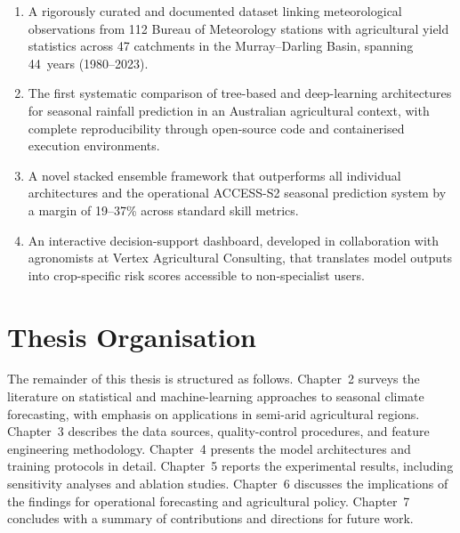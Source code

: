\documentclass[12pt,a4paper]{report}
\begin{document}
\begin{enumerate}[label=C\arabic*:,leftmargin=*]
  \item A rigorously curated and documented dataset linking meteorological
        observations from 112 Bureau of Meteorology stations with agricultural
        yield statistics across 47 catchments in the Murray--Darling Basin,
        spanning 44~years (1980--2023).
  \item The first systematic comparison of tree-based and deep-learning
        architectures for seasonal rainfall prediction in an Australian
        agricultural context, with complete reproducibility through
        open-source code and containerised execution environments.
  \item A novel stacked ensemble framework that outperforms all individual
        architectures and the operational ACCESS-S2 seasonal prediction
        system by a margin of 19--37\% across standard skill metrics.
  \item An interactive decision-support dashboard, developed in collaboration
        with agronomists at Vertex Agricultural Consulting, that translates
        model outputs into crop-specific risk scores accessible to
        non-specialist users.
\end{enumerate}

\section{Thesis Organisation}

The remainder of this thesis is structured as follows. Chapter~2 surveys the
literature on statistical and machine-learning approaches to seasonal climate
forecasting, with emphasis on applications in semi-arid agricultural regions.
Chapter~3 describes the data sources, quality-control procedures, and feature
engineering methodology. Chapter~4 presents the model architectures and
training protocols in detail. Chapter~5 reports the experimental results,
including sensitivity analyses and ablation studies. Chapter~6 discusses the
implications of the findings for operational forecasting and agricultural
policy. Chapter~7 concludes with a summary of contributions and directions for
future work.
\end{document}
